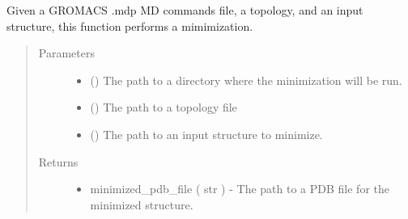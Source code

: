 \documentclass[letterpaper,12pt,english,openany,oneside]{sphinxmanual}
\begin{document}
\begin{fulllineitems}
\label{\detokenize{simulation:simulation.minimize}}
Given a GROMACS .mdp MD commands file, a topology, and an input structure, this function performs a mimimization.
\begin{quote}\begin{description}
\item[{Parameters}] \leavevmode\begin{itemize}
\item {} 
 () \textendash{} The path to a directory where the minimization will be run.

\item {} 
 () \textendash{} The path to a topology file

\item {} 
 () \textendash{} The path to an input structure to minimize.

\end{itemize}

\item[{Returns}] \leavevmode
\begin{itemize}
\item {} 
minimized\_pdb\_file ( str ) - The path to a PDB file for the minimized structure.

\end{itemize}


\end{description}\end{quote}

\end{fulllineitems}

\end{document}
